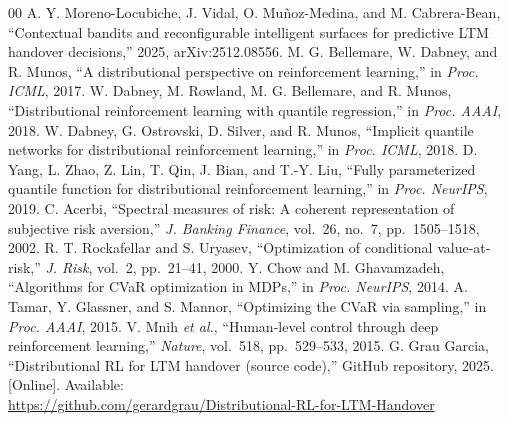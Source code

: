 \documentclass[conference]{IEEEtran}
\begin{document}
\begin{thebibliography}{00}
 A. Y. Moreno-Locubiche, J. Vidal, O. Mu\~{n}oz-Medina, and M. Cabrera-Bean, ``Contextual bandits and reconfigurable intelligent surfaces for predictive LTM handover decisions,'' 2025, arXiv:2512.08556.
 M. G. Bellemare, W. Dabney, and R. Munos, ``A distributional perspective on reinforcement learning,'' in \emph{Proc. ICML}, 2017.
 W. Dabney, M. Rowland, M. G. Bellemare, and R. Munos, ``Distributional reinforcement learning with quantile regression,'' in \emph{Proc. AAAI}, 2018.
 W. Dabney, G. Ostrovski, D. Silver, and R. Munos, ``Implicit quantile networks for distributional reinforcement learning,'' in \emph{Proc. ICML}, 2018.
 D. Yang, L. Zhao, Z. Lin, T. Qin, J. Bian, and T.-Y. Liu, ``Fully parameterized quantile function for distributional reinforcement learning,'' in \emph{Proc. NeurIPS}, 2019.
 C. Acerbi, ``Spectral measures of risk: A coherent representation of subjective risk aversion,'' \emph{J. Banking Finance}, vol.~26, no.~7, pp.~1505--1518, 2002.
 R. T. Rockafellar and S. Uryasev, ``Optimization of conditional value-at-risk,'' \emph{J. Risk}, vol.~2, pp.~21--41, 2000.
 Y. Chow and M. Ghavamzadeh, ``Algorithms for CVaR optimization in MDPs,'' in \emph{Proc. NeurIPS}, 2014.
 A. Tamar, Y. Glassner, and S. Mannor, ``Optimizing the CVaR via sampling,'' in \emph{Proc. AAAI}, 2015.
 V. Mnih \emph{et al.}, ``Human-level control through deep reinforcement learning,'' \emph{Nature}, vol.~518, pp.~529--533, 2015.
 G. Grau Garcia, ``Distributional RL for LTM handover (source code),'' GitHub repository, 2025. [Online]. Available:\\\url{https://github.com/gerardgrau/Distributional-RL-for-LTM-Handover}
\end{thebibliography}
\end{document}

